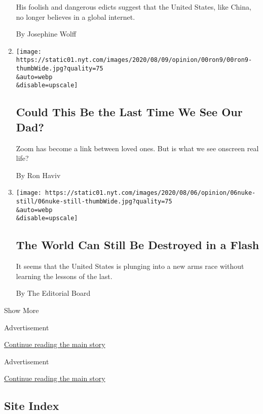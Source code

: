 \begin{enumerate}
  His foolish and dangerous edicts suggest that the United States, like
  China, no longer believes in a global internet.

  By Josephine Wolff
\item
  \href{/2020/08/06/opinion/sunday/coronavirus-baruch-haviv-death.html}{}

  \texttt{[image: https://static01.nyt.com/images/2020/08/09/opinion/00ron9/00ron9-thumbWide.jpg?quality=75\\\&auto=webp\\\&disable=upscale]}

  \hypertarget{could-this-be-the-last-time-we-see-our-dad}{%
  \subsection{Could This Be the Last Time We See Our
  Dad?}\label{could-this-be-the-last-time-we-see-our-dad}}

  Zoom has become a link between loved ones. But is what we see onscreen
  real life?

  By Ron Haviv
\item
  \href{/2020/08/06/opinion/hiroshima-anniversary-nuclear-weapons.html}{}

  \texttt{[image: https://static01.nyt.com/images/2020/08/06/opinion/06nuke-still/06nuke-still-thumbWide.jpg?quality=75\\\&auto=webp\\\&disable=upscale]}

  \hypertarget{the-world-can-still-be-destroyed-in-a-flash}{%
  \subsection{The World Can Still Be Destroyed in a
  Flash}\label{the-world-can-still-be-destroyed-in-a-flash}}

  It seems that the United States is plunging into a new arms race
  without learning the lessons of the last.

  By The Editorial Board
\end{enumerate}

Show More

Advertisement

\protect\hyperlink{after-mid2}{Continue reading the main story}

Advertisement

\protect\hyperlink{after-mktg}{Continue reading the main story}

\hypertarget{site-index}{%
\subsection{Site Index}\label{site-index}}

